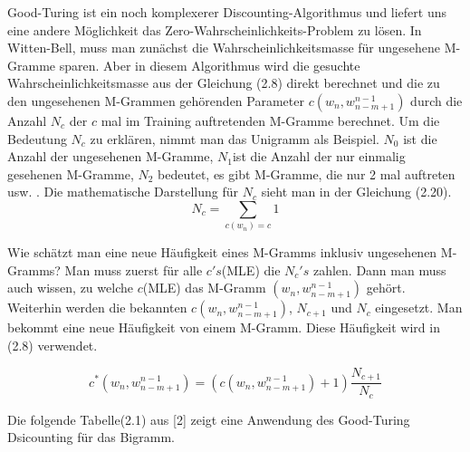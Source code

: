 Good-Turing ist ein noch komplexerer Discounting-Algorithmus und liefert uns eine andere M\"oglichkeit  das Zero-Wahrscheinlichkeits-Problem zu l\"osen. In Witten-Bell, muss man zun\"achst die Wahrscheinlichkeitsmasse f\"ur ungesehene M-Gramme sparen. Aber in diesem Algorithmus wird die gesuchte Wahrscheinlichkeitsmasse aus der Gleichung (2.8) direkt berechnet und die zu den ungesehenen M-Grammen geh\"orenden Parameter $c(w_{n},w_{n-m+1}^{n-1})$ durch die Anzahl $N_{c}$ der  $c$ mal im Training auftretenden M-Gramme berechnet. Um die Bedeutung $N_{c}$ zu erkl\"aren, nimmt man das Unigramm als Beispiel. $N_{0}$ ist die Anzahl der ungesehenen M-Gramme, $N_{1}$ist die Anzahl der nur einmalig gesehenen M-Gramme, $N_{2}$ bedeutet, es gibt  M-Gramme, die nur 2 mal auftreten usw. . Die mathematische Darstellung f\"ur $N_{c}$ sieht man in der Gleichung (2.20).
\begin{equation}
N_{c}=\sum_{c(w_{n})=c}1
\end{equation}

Wie sch\"atzt man eine neue H\"aufigkeit eines M-Gramms inklusiv ungesehenen M-Gramms? Man muss zuerst f\"ur alle $c's$(MLE) die $N_{c}'s$ zahlen. Dann man muss auch wissen, zu welche $c$(MLE) das M-Gramm $(w_{n},w_{n-m+1}^{n-1})$  geh\"ort. Weiterhin werden die bekannten $c(w_{n},w_{n-m+1}^{n-1})$, $N_{c+1}$ und $N_{c}$ eingesetzt. Man bekommt eine neue H\"aufigkeit von einem M-Gramm. Diese H\"aufigkeit wird in (2.8) verwendet.

\begin{equation}
c^{*}(w_{n},w_{n-m+1}^{n-1})=(c(w_{n},w_{n-m+1}^{n-1})+1)\frac{N_{c+1}}{N_{c}}
\end{equation}

Die folgende Tabelle(2.1)  aus [2] zeigt eine Anwendung des Good-Turing Dsicounting f\"ur das Bigramm.

